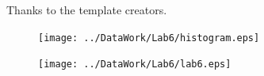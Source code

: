 \documentclass{tufte-handout}
\begin{document}
Thanks to the template creators.\cite{tuftelatex}




\newpage

\begin{figure}[h]
\texttt{[image: ../DataWork/Lab6/histogram.eps]}
\end{figure}

\begin{figure}[h]
\texttt{[image: ../DataWork/Lab6/lab6.eps]}
\end{figure}

\begin{figure}[h]
{
}
\end{figure}
\end{document}
